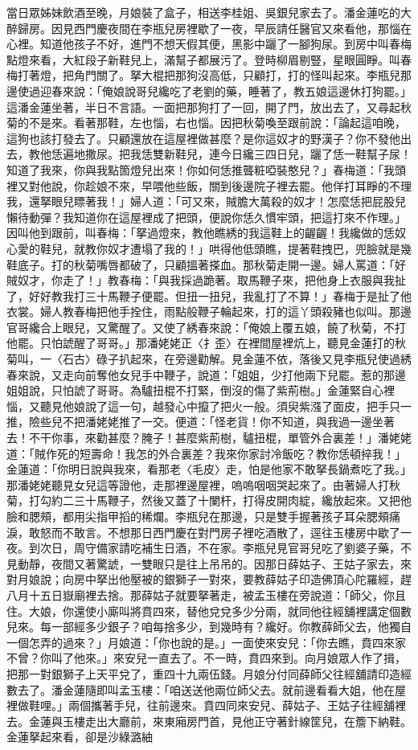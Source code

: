 當日眾姊妹飲酒至晚，月娘裝了盒子，相送李桂姐、吳銀兒家去了。潘金蓮吃的大醉歸房。因見西門慶夜間在李瓶兒房裡歇了一夜，早辰請任醫官又來看他，那惱在心裡。知道他孩子不好，進門不想天假其便，黑影中躧了一腳狗尿。到房中叫春梅點燈來看，大紅段子新鞋兒上，滿幫子都展污了。登時柳眉剔豎，星眼圓睜。叫春梅打著燈，把角門關了。拏大棍把那狗沒高低，只顧打，打的怪叫起來。李瓶兒那邊使過迎春來說：「俺娘說哥兒纔吃了老劉的藥，睡著了，教五娘這邊休打狗罷。」這潘金蓮坐著，半日不言語。一面把那狗打了一回，開了門，放出去了，又尋起秋菊的不是來。看著那鞋，左也惱，右也惱。因把秋菊喚至跟前說：「論起這咱晚，這狗也該打發去了。只顧還放在這屋裡做甚麼？是你這奴才的野漢子？你不發他出去，教他恁遍地撒尿。把我恁雙新鞋兒，連今日纔三四日兒，躧了恁一鞋幫子尿！知道了我來，你與我點箇燈兒出來！你如何恁推聾粧啞裝憨兒？」春梅道：「我頭裡又對他說，你趁娘不來，早喂他些飯，關到後邊院子裡去罷。他佯打耳睜的不理我，還拏眼兒瞟著我！」婦人道：「可又來，賊膽大萬殺的奴才！怎麼恁把屁股兒懶待動彈？我知道你在這屋裡成了把頭，便說你恁久慣牢頭，把這打來不作理。」因叫他到跟前，叫春梅：「拏過燈來，教他瞧綉的我這鞋上的齷齷！我纔做的恁奴心愛的鞋兒，就教你奴才遭塌了我的！」哄得他低頭瞧，提著鞋拽巴，兜臉就是幾鞋底子。打的秋菊嘴唇都破了，只顧搵著搽血。那秋菊走開一邊。婦人罵道：「好賊奴才，你走了！」教春梅：「與我採過跪著。取馬鞭子來，把他身上衣服與我扯了，好好教我打三十馬鞭子便罷。但扭一扭兒，我亂打了不算！」春梅于是扯了他衣裳。婦人教春梅把他手拴住，雨點般鞭子輪起來，打的這丫頭殺豬也似叫。那邊官哥纔合上眼兒，又驚醒了。又使了綉春來說：「俺娘上覆五娘，饒了秋菊，不打他罷。只怕諕醒了哥哥。」那潘姥姥正〈扌歪〉在裡間屋裡炕上，聽見金蓮打的秋菊叫，一〈石古〉碌子扒起來，在旁邊勸解。見金蓮不依，落後又見李瓶兒使過綉春來說，又走向前奪他女兒手中鞭子，說道：「姐姐，少打他兩下兒罷。惹的那邊姐姐說，只怕諕了哥哥。為驢扭棍不打緊，倒沒的傷了紫荊樹。」金蓮緊自心裡惱，又聽見他娘說了這一句，越發心中攛了把火一般。須臾紫漒了面皮，把手只一推，險些兒不把潘姥姥推了一交。便道：「怪老貨！你不知道，與我過一邊坐著去！不干你事，來勸甚麼？腌子！甚麼紫荊樹，驢扭棍，單管外合裏差！」潘姥姥道：「賊作死的短壽命！我怎的外合裏差？我來你家討冷飯吃？教你恁頓捽我！」金蓮道：「你明日說與我來，看那老〈毛皮〉走，怕是他家不敢拏長鍋煮吃了我。」那潘姥姥聽見女兒這等證他，走那裡邊屋裡，嗚嗚咽咽哭起來了。由著婦人打秋菊，打勾約二三十馬鞭子，然後又蓋了十闌杆，打得皮開肉綻，纔放起來。又把他臉和腮頰，都用尖指甲搯的稀爛。李瓶兒在那邊，只是雙手握著孩子耳朵腮頰痛淚，敢怒而不敢言。不想那日西門慶在對門房子裡吃酒散了，逕往玉樓房中歇了一夜。到次日，周守備家請吃補生日酒，不在家。李瓶兒見官哥兒吃了劉婆子藥，不見動靜，夜間又著驚諕，一雙眼只是往上吊吊的。因那日薛姑子、王姑子家去，來對月娘說；向房中拏出他壓被的銀獅子一對來，要教薛姑子印造佛頂心陀羅經，趕八月十五日嶽廟裡去捨。那薛姑子就要拏著走，被孟玉樓在旁說道：「師父，你且住。大娘，你還使小廝叫將賁四來，替他兌兌多少分兩，就同他往經舖裡講定個數兒來。每一部經多少銀子？咱每捨多少，到幾時有？纔好。你教薛師父去，他獨自一個怎弄的過來？」月娘道：「你也說的是。」一面使來安兒：「你去瞧，賁四來家不曾？你叫了他來。」來安兒一直去了。不一時，賁四來到。向月娘眾人作了揖，把那一對銀獅子上天平兌了，重四十九兩伍錢。月娘分付同薛師父往經舖請印造經數去了。潘金蓮隨即叫孟玉樓：「咱送送他兩位師父去。就前邊看看大姐，他在屋裡做鞋哩。」兩個攜著手兒，往前邊來。賁四同來安兒、薛姑子、王姑子往經舖裡去。金蓮與玉樓走出大廳前，來東廂房門首，見他正守著針線筐兒，在簷下納鞋。金蓮拏起來看，卻是沙綠潞紬